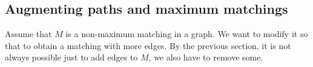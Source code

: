 \subsection{Augmenting paths and maximum matchings}
Assume that $M$ is a non-maximum matching in a graph.
We want to modify it so that to obtain a matching with more edges.
By the previous section, it is not always possible just to add edges to $M$, we also have to remove some.
